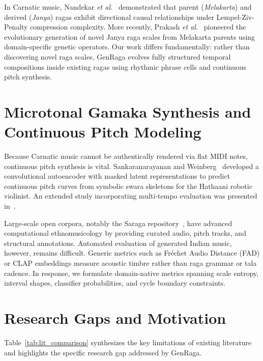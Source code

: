 \documentclass[12pt,a4paper]{report}
\begin{document}
In Carnatic music, Nandekar \textit{et al.}~\cite{nandekar2021} demonstrated that parent (\textit{Melakarta}) and derived (\textit{Janya}) ragas exhibit directional causal relationships under Lempel-Ziv-Penalty compression complexity. More recently, Prakash \textit{et al.}~\cite{prakash2026} pioneered the evolutionary generation of novel Janya raga scales from Melakarta parents using domain-specific genetic operators. Our work differs fundamentally: rather than discovering novel raga scales, GenRaga evolves fully structured temporal compositions inside existing ragas using rhythmic phrase cells and continuous pitch synthesis.

\section{Microtonal Gamaka Synthesis and Continuous Pitch Modeling}
Because Carnatic music cannot be authentically rendered via flat MIDI notes, continuous pitch synthesis is vital. Sankaranarayanan and Weinberg~\cite{gamaka2022} developed a convolutional autoencoder with masked latent representations to predict continuous pitch curves from symbolic swara skeletons for the Hathaani robotic violinist. An extended study incorporating multi-tempo evaluation was presented in~\cite{gamaka2025}. 

Large-scale open corpora, notably the Saraga repository~\cite{saraga2021}, have advanced computational ethnomusicology by providing curated audio, pitch tracks, and structural annotations. Automated evaluation of generated Indian music, however, remains difficult. Generic metrics such as Fr{\'e}chet Audio Distance (FAD) or CLAP embeddings measure acoustic timbre rather than raga grammar or tala cadence. In response, we formulate domain-native metrics spanning scale entropy, interval shapes, classifier probabilities, and cycle boundary constraints.

\section{Research Gaps and Motivation}
Table~\ref{tab:lit_comparison} synthesizes the key limitations of existing literature and highlights the specific research gap addressed by GenRaga.
\end{document}
